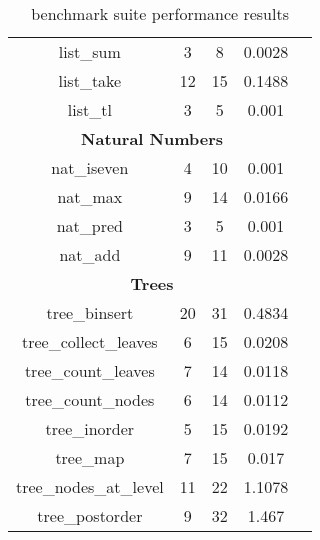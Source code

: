 \begin{table}
\begin{center}
\begin{tabular}{ccccc}
list\_sum & 3 & 8 & 0.0028 \\
list\_take & 12 & 15 & 0.1488 \\
list\_tl & 3 & 5 & 0.001 \\
\multicolumn{4}{c}{\textbf{Natural Numbers}} \\
nat\_iseven & 4 & 10 & 0.001 \\
nat\_max & 9 & 14 & 0.0166 \\
nat\_pred & 3 & 5 & 0.001 \\
nat\_add & 9 & 11 & 0.0028 \\
\multicolumn{4}{c}{\textbf{Trees}} \\
tree\_binsert & 20 & 31 & 0.4834 \\
tree\_collect\_leaves & 6 & 15 & 0.0208 \\
tree\_count\_leaves & 7 & 14 & 0.0118 \\
tree\_count\_nodes & 6 & 14 & 0.0112 \\
tree\_inorder & 5 & 15 & 0.0192 \\
tree\_map & 7 & 15 & 0.017 \\
tree\_nodes\_at\_level & 11 & 22 & 1.1078 \\
tree\_postorder & 9 & 32 & 1.467 \\

  \hline
  \end{tabular}
  \end{center}
  \caption{\myth{} benchmark suite performance results}
  \label{tbl:myth-raw-benchmarks}
\end{table}
